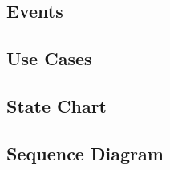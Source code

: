 \subsection{Events}

\subsection{Use Cases}

\subsection{State Chart}

\subsection{Sequence Diagram}